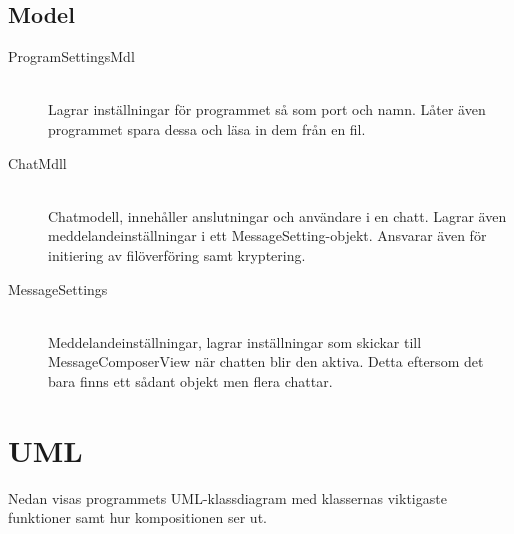 \documentclass{article}
\begin{document}
\subsection{Model}
\begin{description}
  \item[ProgramSettingsMdl] \hfill \\
  Lagrar inställningar för programmet så som port och namn. Låter även programmet spara dessa och läsa in dem från en fil.
\item[ChatMdll] \hfill \\
  Chatmodell, innehåller anslutningar och användare i en chatt. Lagrar även meddelandeinställningar i ett MessageSetting-objekt. Ansvarar även för initiering av filöverföring samt kryptering.
\item[MessageSettings] \hfill \\
  Meddelandeinställningar, lagrar inställningar som skickar till MessageComposerView när chatten blir den aktiva. Detta eftersom det bara finns ett sådant objekt men flera chattar.
\end{description}

\pagebreak

\section{UML}

Nedan visas programmets UML-klassdiagram med klassernas viktigaste funktioner samt hur kompositionen ser ut.
\end{document}

